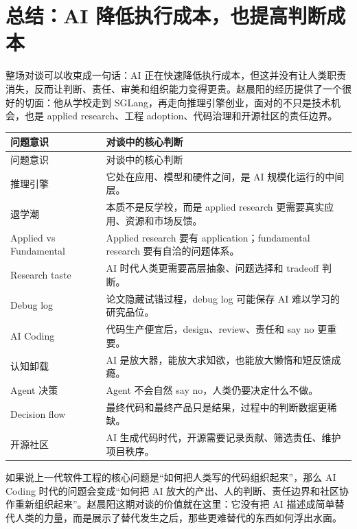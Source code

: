 \section{总结：AI 降低执行成本，也提高判断成本}

整场对谈可以收束成一句话：AI 正在快速降低执行成本，但这并没有让人类职责消失，反而让判断、责任、审美和组织能力变得更贵。赵晨阳的经历提供了一个很好的切面：他从学校走到 SGLang，再走向推理引擎创业，面对的不只是技术机会，也是 applied research、工程 adoption、代码治理和开源社区的责任边界。

\begin{longtable}{>{\raggedright\arraybackslash}p{} >{\raggedright\arraybackslash}p{}}
\toprule
问题意识 & 对谈中的核心判断 \\
\midrule
\endfirsthead
\toprule
问题意识 & 对谈中的核心判断 \\
\midrule
\endhead
推理引擎 & 它处在应用、模型和硬件之间，是 AI 规模化运行的中间层。 \\
退学潮 & 本质不是反学校，而是 applied research 更需要真实应用、资源和市场反馈。 \\
Applied vs Fundamental & Applied research 要有 application；fundamental research 要有自洽的问题体系。 \\
Research taste & AI 时代人类更需要高层抽象、问题选择和 tradeoff 判断。 \\
Debug log & 论文隐藏试错过程，debug log 可能保存 AI 难以学习的研究品位。 \\
AI Coding & 代码生产便宜后，design、review、责任和 say no 更重要。 \\
认知卸载 & AI 是放大器，能放大求知欲，也能放大懒惰和短反馈成瘾。 \\
Agent 决策 & Agent 不会自然 say no，人类仍要决定什么不做。 \\
Decision flow & 最终代码和最终产品只是结果，过程中的判断数据更稀缺。 \\
开源社区 & AI 生成代码时代，开源需要记录贡献、筛选责任、维护项目秩序。 \\
\bottomrule
\end{longtable}

如果说上一代软件工程的核心问题是“如何把人类写的代码组织起来”，那么 AI Coding 时代的问题会变成“如何把 AI 放大的产出、人的判断、责任边界和社区协作重新组织起来”。赵晨阳这期对谈的价值就在这里：它没有把 AI 描述成简单替代人类的力量，而是展示了替代发生之后，那些更难替代的东西如何浮出水面。

